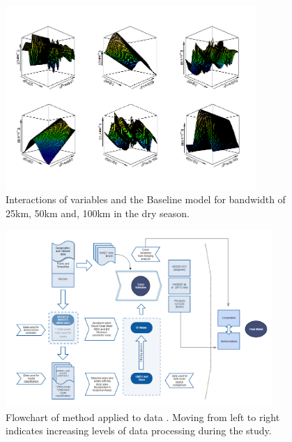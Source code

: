 \begin{table}

\begin{figure}[H]
  \centering
  \includegraphics[width=0.85\textwidth, inner]{visgamd.png}
\caption[Interactions of variables and the Baseline model for bandwidth of 25km, 50km and, 100km in the dry season]{Interactions of variables and the Baseline model for bandwidth of 25km, 50km and, 100km in the dry season.}
\label{fig:visgamd}
\end{figure}
\end{table}

\begin{table}

\begin{figure}[H]
  \centering
  \includegraphics[width=0.9\textwidth, inner]{method.png}
\caption[Flowchart of method applied to data]{Flowchart of method applied to data . Moving from left to right indicates increasing levels of data processing during the study.}
\label{fig:method2}
\end{figure}
\end{table}


